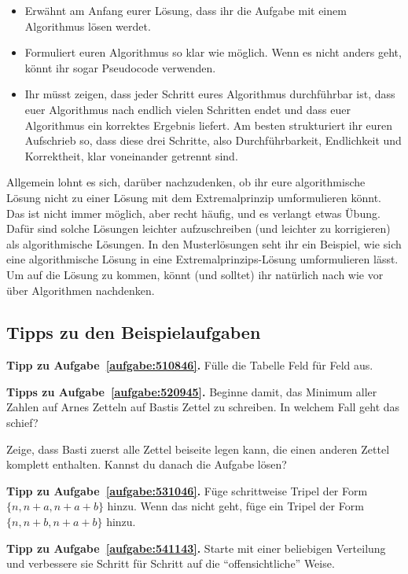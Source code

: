 \begin{itemize}
	\item Erwähnt am Anfang eurer Lösung, dass ihr die Aufgabe mit einem Algorithmus lösen werdet.
	\item Formuliert euren Algorithmus so klar wie möglich. Wenn es nicht anders geht, könnt ihr sogar Pseudocode verwenden.
	\item Ihr müsst zeigen, dass jeder Schritt eures Algorithmus durchführbar ist, dass euer Algorithmus nach endlich vielen Schritten endet und dass euer Algorithmus ein korrektes Ergebnis liefert. Am besten strukturiert ihr euren Aufschrieb so, dass diese drei Schritte, also Durchführbarkeit, Endlichkeit und Korrektheit, klar voneinander getrennt sind.
\end{itemize}
Allgemein lohnt es sich, darüber nachzudenken, ob ihr eure algorithmische Lösung nicht zu einer Lösung mit dem Extremalprinzip umformulieren könnt. Das ist nicht immer möglich, aber recht häufig, und es verlangt etwas Übung. Dafür sind solche Lösungen leichter aufzuschreiben (und leichter zu korrigieren) als algorithmische Lösungen. In den Musterlösungen seht ihr ein Beispiel, wie sich eine algorithmische Lösung in eine Extremalprinzips-Lösung umformulieren lässt. Um auf die Lösung zu kommen, könnt (und solltet) ihr natürlich nach wie vor über Algorithmen nachdenken.


\subsection*{Tipps zu den Beispielaufgaben}
\textbf{Tipp zu Aufgabe~\ref{aufgabe:510846}.} Fülle die Tabelle Feld für Feld aus.

\textbf{Tipps zu Aufgabe~\ref{aufgabe:520945}.} Beginne damit, das Minimum aller Zahlen auf Arnes Zetteln auf Bastis Zettel zu schreiben. In welchem Fall geht das schief?

Zeige, dass Basti zuerst alle Zettel beiseite legen kann, die einen anderen Zettel komplett enthalten. Kannst du danach die Aufgabe lösen?

\textbf{Tipp zu Aufgabe~\ref{aufgabe:531046}.} Füge schrittweise Tripel der Form $\{n,n+a,n+a+b\}$ hinzu. Wenn das nicht geht, füge ein Tripel der Form $\{n,n+b,n+a+b\}$ hinzu.

\textbf{Tipp zu Aufgabe~\ref{aufgabe:541143}.} Starte mit einer beliebigen Verteilung und verbessere sie Schritt für Schritt auf die \enquote{offensichtliche} Weise.
